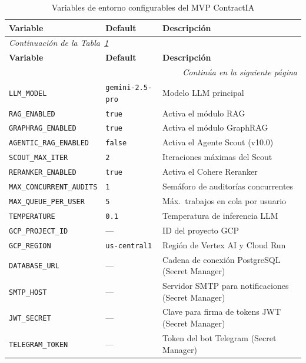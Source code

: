 \begin{longtable}{p{4.5cm} p{3cm} p{6cm}}
\caption{Variables de entorno configurables del MVP ContractIA}
\label{tab:env_vars} \\
\toprule
\textbf{Variable} & \textbf{Default} & \textbf{Descripción} \\
\midrule
\endfirsthead
\multicolumn{3}{l}{\small\itshape Continuación de la Tabla~\ref{tab:env_vars}} \\[4pt]
\toprule
\textbf{Variable} & \textbf{Default} & \textbf{Descripción} \\
\midrule
\endhead
\midrule
\multicolumn{3}{r}{\small\itshape Continúa en la siguiente página} \\
\endfoot
\bottomrule
\endlastfoot
\texttt{LLM\_MODEL}              & \texttt{gemini-2.5-pro} & Modelo LLM principal \\[6pt]
\texttt{RAG\_ENABLED}            & \texttt{true}   & Activa el módulo RAG \\[6pt]
\texttt{GRAPHRAG\_ENABLED}       & \texttt{true}   & Activa el módulo GraphRAG \\[6pt]
\texttt{AGENTIC\_RAG\_ENABLED}   & \texttt{false}  & Activa el Agente Scout (v10.0) \\[6pt]
\texttt{SCOUT\_MAX\_ITER}        & \texttt{2}      & Iteraciones máximas del Scout \\[6pt]
\texttt{RERANKER\_ENABLED}       & \texttt{true}   & Activa el Cohere Reranker \\[6pt]
\texttt{MAX\_CONCURRENT\_AUDITS} & \texttt{1}      & Semáforo de auditorías concurrentes \\[6pt]
\texttt{MAX\_QUEUE\_PER\_USER}   & \texttt{5}      & Máx.\ trabajos en cola por usuario \\[6pt]
\texttt{TEMPERATURE}             & \texttt{0.1}    & Temperatura de inferencia LLM \\[6pt]
\texttt{GCP\_PROJECT\_ID}        & —               & ID del proyecto GCP \\[6pt]
\texttt{GCP\_REGION}             & \texttt{us-central1} & Región de Vertex AI y Cloud Run \\[6pt]
\texttt{DATABASE\_URL}           & —               & Cadena de conexión PostgreSQL (Secret Manager) \\[6pt]
\texttt{SMTP\_HOST}              & —               & Servidor SMTP para notificaciones (Secret Manager) \\[6pt]
\texttt{JWT\_SECRET}             & —               & Clave para firma de tokens JWT (Secret Manager) \\[6pt]
\texttt{TELEGRAM\_TOKEN}         & —               & Token del bot Telegram (Secret Manager) \\
\end{longtable}

